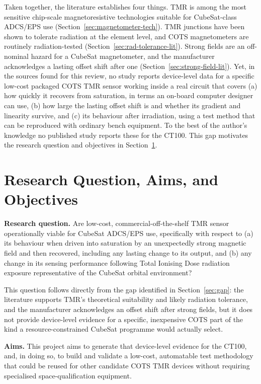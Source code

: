 \documentclass[12pt,a4paper]{article}
\begin{document}
Taken together, the literature establishes four things. TMR is among the most sensitive chip-scale magnetoresistive technologies suitable for CubeSat-class ADCS/EPS use (Section~\ref{sec:magnetometer-tech}). TMR junctions have been shown to tolerate radiation at the element level, and COTS magnetometers are routinely radiation-tested (Section~\ref{sec:rad-tolerance-lit}). Strong fields are an off-nominal hazard for a CubeSat magnetometer, and the manufacturer acknowledges a lasting offset shift after one (Section~\ref{sec:strong-field-lit}). Yet, in the sources found for this review, no study reports device-level data for a specific low-cost packaged COTS TMR sensor working inside a real circuit that covers (a) how quickly it recovers from saturation, in terms an on-board computer designer can use, (b) how large the lasting offset shift is and whether its gradient and linearity survive, and (c) its behaviour after irradiation, using a test method that can be reproduced with ordinary bench equipment. To the best of the author's knowledge no published study reports these for the CT100. This gap motivates the research question and objectives in Section~\ref{sec:research-question}.

\section{Research Question, Aims, and Objectives}
\label{sec:research-question}

\textbf{Research question.} Are low-cost, commercial-off-the-shelf TMR sensor operationally viable for CubeSat ADCS/EPS use, specifically with respect to (a) its behaviour when driven into saturation by an unexpectedly strong magnetic field and then recovered, including any lasting change to its output, and (b) any change in its sensing performance following Total Ionising Dose radiation exposure representative of the CubeSat orbital environment?

This question follows directly from the gap identified in Section~\ref{sec:gap}: the literature supports TMR's theoretical suitability and likely radiation tolerance, and the manufacturer acknowledges an offset shift after strong fields, but it does not provide device-level evidence for a specific, inexpensive COTS part of the kind a resource-constrained CubeSat programme would actually select.

\textbf{Aims.} This project aims to generate that device-level evidence for the CT100, and, in doing so, to build and validate a low-cost, automatable test methodology that could be reused for other candidate COTS TMR devices without requiring specialised space-qualification equipment.
\end{document}
